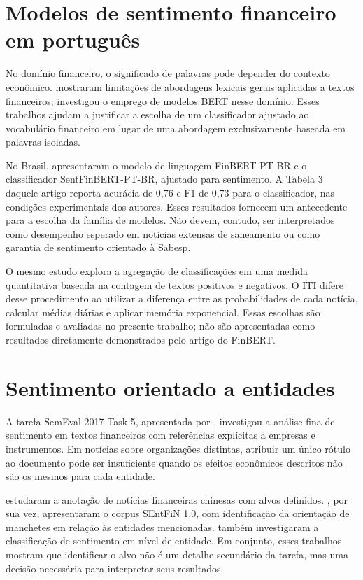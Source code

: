 \section{Modelos de sentimento financeiro em português}

No domínio financeiro, o significado de palavras pode depender do contexto econômico.  mostraram limitações de abordagens lexicais gerais aplicadas a textos financeiros;  investigou o emprego de modelos BERT nesse domínio. Esses trabalhos ajudam a justificar a escolha de um classificador ajustado ao vocabulário financeiro em lugar de uma abordagem exclusivamente baseada em palavras isoladas.

No Brasil,  apresentaram o modelo de linguagem FinBERT-PT-BR e o classificador SentFinBERT-PT-BR, ajustado para sentimento. A Tabela 3 daquele artigo reporta acurácia de 0,76 e F1 de 0,73 para o classificador, nas condições experimentais dos autores. Esses resultados fornecem um antecedente para a escolha da família de modelos. Não devem, contudo, ser interpretados como desempenho esperado em notícias extensas de saneamento ou como garantia de sentimento orientado à Sabesp.

O mesmo estudo explora a agregação de classificações em uma medida quantitativa baseada na contagem de textos positivos e negativos. O ITI difere desse procedimento ao utilizar a diferença entre as probabilidades de cada notícia, calcular médias diárias e aplicar memória exponencial. Essas escolhas são formuladas e avaliadas no presente trabalho; não são apresentadas como resultados diretamente demonstrados pelo artigo do FinBERT.

\section{Sentimento orientado a entidades}

A tarefa SemEval-2017 Task 5, apresentada por , investigou a análise fina de sentimento em textos financeiros com referências explícitas a empresas e instrumentos. Em notícias sobre organizações distintas, atribuir um único rótulo ao documento pode ser insuficiente quando os efeitos econômicos descritos não são os mesmos para cada entidade.

 estudaram a anotação de notícias financeiras chinesas com alvos definidos. , por sua vez, apresentaram o corpus SEntFiN 1.0, com identificação da orientação de manchetes em relação às entidades mencionadas.  também investigaram a classificação de sentimento em nível de entidade. Em conjunto, esses trabalhos mostram que identificar o alvo não é um detalhe secundário da tarefa, mas uma decisão necessária para interpretar seus resultados.

